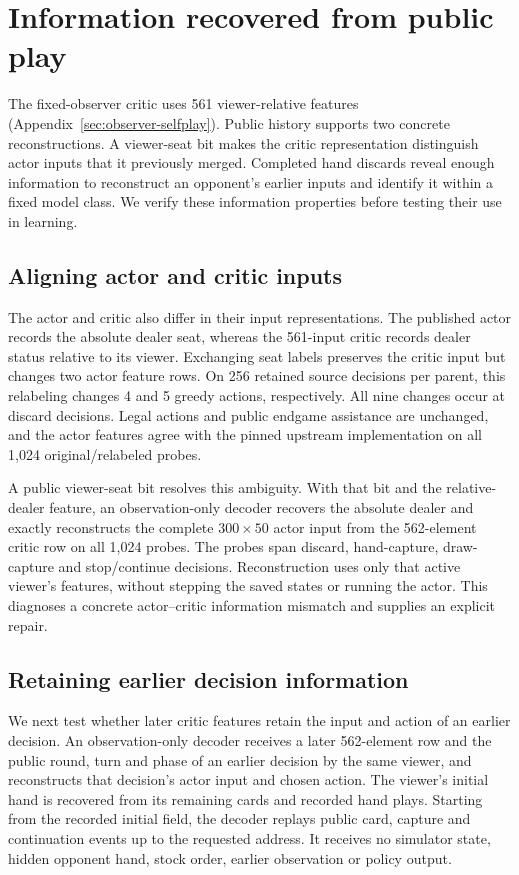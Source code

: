 \section{Information recovered from public play}
\label{sec:public-information}
The fixed-observer critic uses 561 viewer-relative features
(Appendix~\ref{sec:observer-selfplay}). Public history supports two concrete
reconstructions. A viewer-seat bit makes
the critic representation distinguish actor inputs that it previously merged.
Completed hand discards reveal enough information to reconstruct an opponent's
earlier inputs and identify it within a fixed model class. We verify these
information properties before testing their use in learning.

\subsection{Aligning actor and critic inputs}
The actor and critic also differ in their input representations. The published
actor records the absolute dealer seat, whereas the 561-input critic records
dealer status relative to its viewer. Exchanging seat labels preserves the
critic input but changes two actor feature rows. On 256 retained source
decisions per parent, this relabeling changes 4 and 5 greedy actions,
respectively. All nine changes occur at discard decisions. Legal actions and
public endgame assistance are unchanged, and the actor features agree with
the pinned upstream implementation on all 1,024 original/relabeled probes.

A public viewer-seat bit resolves this ambiguity. With that bit and the
relative-dealer feature, an observation-only decoder recovers the absolute
dealer and exactly reconstructs the complete $300\times50$ actor input from
the 562-element critic row on all 1,024 probes. The probes span discard,
hand-capture, draw-capture and stop/continue decisions. Reconstruction uses
only that active viewer's features, without stepping the saved states or
running the actor. This diagnoses a concrete actor--critic information
mismatch and supplies an explicit repair.

\subsection{Retaining earlier decision information}
\label{sec:temporal-information}
We next test whether later critic features retain the input and action of an
earlier decision. An observation-only decoder receives a later 562-element
row and the public round, turn and phase of
an earlier decision by the same viewer, and reconstructs that decision's actor
input and chosen action. The viewer's initial hand is recovered from its
remaining cards and recorded hand plays. Starting from the recorded initial
field, the decoder replays public card, capture and continuation events up to
the requested address. It receives no simulator state, hidden opponent hand,
stock order, earlier observation or policy output.

